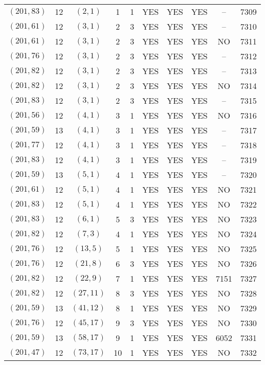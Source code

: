 \begin{longtable}{|c|c|c|c|c|c|c|c|c|c|}
$(201, 83)$ & 12 & $(2, 1)$ & 1 & 1 & YES & YES & YES & -- & 7309\\
$(201, 61)$ & 12 & $(3, 1)$ & 2 & 3 & YES & YES & YES & -- & 7310\\
$(201, 61)$ & 12 & $(3, 1)$ & 2 & 3 & YES & YES & YES & NO & 7311\\
$(201, 76)$ & 12 & $(3, 1)$ & 2 & 3 & YES & YES & YES & -- & 7312\\
$(201, 82)$ & 12 & $(3, 1)$ & 2 & 3 & YES & YES & YES & -- & 7313\\
$(201, 82)$ & 12 & $(3, 1)$ & 2 & 3 & YES & YES & YES & NO & 7314\\
$(201, 83)$ & 12 & $(3, 1)$ & 2 & 3 & YES & YES & YES & -- & 7315\\
$(201, 56)$ & 12 & $(4, 1)$ & 3 & 1 & YES & YES & YES & NO & 7316\\
$(201, 59)$ & 13 & $(4, 1)$ & 3 & 1 & YES & YES & YES & -- & 7317\\
$(201, 77)$ & 12 & $(4, 1)$ & 3 & 1 & YES & YES & YES & -- & 7318\\
$(201, 83)$ & 12 & $(4, 1)$ & 3 & 1 & YES & YES & YES & -- & 7319\\
$(201, 59)$ & 13 & $(5, 1)$ & 4 & 1 & YES & YES & YES & -- & 7320\\
$(201, 61)$ & 12 & $(5, 1)$ & 4 & 1 & YES & YES & YES & NO & 7321\\
$(201, 83)$ & 12 & $(5, 1)$ & 4 & 1 & YES & YES & YES & NO & 7322\\
$(201, 83)$ & 12 & $(6, 1)$ & 5 & 3 & YES & YES & YES & NO & 7323\\
$(201, 82)$ & 12 & $(7, 3)$ & 4 & 1 & YES & YES & YES & NO & 7324\\
$(201, 76)$ & 12 & $(13, 5)$ & 5 & 1 & YES & YES & YES & NO & 7325\\
$(201, 76)$ & 12 & $(21, 8)$ & 6 & 3 & YES & YES & YES & NO & 7326\\
$(201, 82)$ & 12 & $(22, 9)$ & 7 & 1 & YES & YES & YES & 7151 & 7327\\
$(201, 82)$ & 12 & $(27, 11)$ & 8 & 3 & YES & YES & YES & NO & 7328\\
$(201, 59)$ & 13 & $(41, 12)$ & 8 & 1 & YES & YES & YES & NO & 7329\\
$(201, 76)$ & 12 & $(45, 17)$ & 9 & 3 & YES & YES & YES & NO & 7330\\
$(201, 59)$ & 13 & $(58, 17)$ & 9 & 1 & YES & YES & YES & 6052 & 7331\\
$(201, 47)$ & 12 & $(73, 17)$ & 10 & 1 & YES & YES & YES & NO & 7332\\

\end{longtable}
